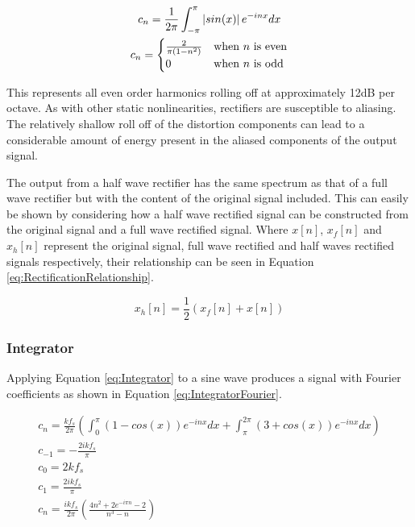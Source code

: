 			\begin{gather}
				c_{n} = \frac{1}{2\pi} \int_{-\pi}^{\pi} \left|sin(x)\right|e^{-inx} dx \nonumber \\
				c_{n} = \begin{cases}
					\frac{2}{\pi(1 - n^{2})} & \text{when $n$ is even} \\
					0 & \text{when $n$ is odd}
				\end{cases}
				\label{eq:RectificationFourier}
			\end{gather}

			This represents all even order harmonics rolling off at approximately 12dB per octave. As with
			other static nonlinearities, rectifiers are susceptible to aliasing. The relatively shallow roll
			off of the distortion components can lead to a considerable amount of energy present in the aliased
			components of the output signal. 

			The output from a half wave rectifier has the same spectrum as that of a full wave rectifier but
			with the content of the original signal included. This can easily be shown by considering how a half
			wave rectified signal can be constructed from the original signal and a full wave rectified signal.
			Where $x[n]$, $x_{f}[n]$ and $x_{h}[n]$ represent the original signal, full wave rectified and half
			waves rectified signals respectively, their relationship can be seen in Equation
			\ref{eq:RectificationRelationship}.

			\begin{equation}
				x_{h}[n] = \frac{1}{2} \left( x_{f}[n] + x[n] \right)
				\label{eq:RectificationRelationship}
			\end{equation}

		\subsubsection*{Integrator}
			Applying Equation \ref{eq:Integrator} to a sine wave produces a signal with Fourier coefficients as
			shown in Equation \ref{eq:IntegratorFourier}.

			\begin{gather}
				c_{n} = \frac{kf_{s}}{2\pi} \left( \int_{0}^{\pi} (1 - cos(x))e^{-inx} dx +
							\int_{\pi}^{2\pi} (3 + cos(x))e^{-inx} dx \right) \nonumber \\
				c_{-1} = - \frac{2ikf_{s}}{\pi} \nonumber \\
				c_{0} = 2kf_{s} \nonumber \\
				c_{1} = \frac{2ikf_{s}}{\pi} \nonumber \\
				c_{n} = \frac{ikf_{s}}{2\pi} \left( \frac{4n^{2} + 2e^{-i\pi n} - 2}{n^{3} - n} \right)
				\label{eq:IntegratorFourier}
			\end{gather}

